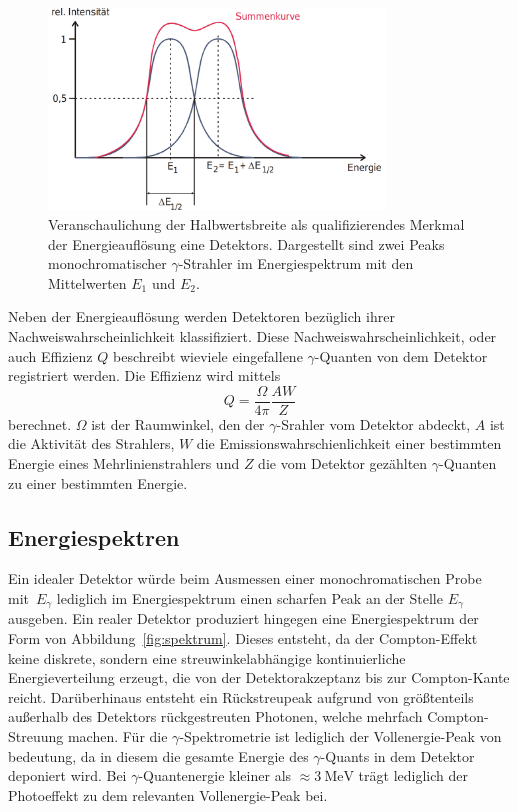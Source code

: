 \begin{figure}
  \centering
  \includegraphics[width=0.8\textwidth]{Pics/energieaufloesung.png}
  \caption{Veranschaulichung der Halbwertsbreite als qualifizierendes Merkmal der Energieauflösung eine Detektors.
  Dargestellt sind zwei Peaks monochromatischer $\gamma$-Strahler im Energiespektrum mit den
  Mittelwerten $E_1$ und $E_2$\cite{anleitung}.}
  \label{fig:energieauflösung}
\end{figure}

Neben der Energieauflösung werden Detektoren bezüglich ihrer Nachweiswahrscheinlichkeit
klassifiziert. Diese Nachweiswahrscheinlichkeit, oder auch Effizienz $Q$
beschreibt wieviele eingefallene $\gamma$-Quanten von dem Detektor
registriert werden.
Die Effizienz wird mittels
\begin{equation}
  \label{eqn:effizienz}
  Q = \frac{\Omega}{4\pi}\frac{AW}{Z}
\end{equation}
berechnet. $\Omega$ ist der Raumwinkel, den der $\gamma$-Srahler vom Detektor abdeckt,
$A$ ist die Aktivität des Strahlers, $W$ die Emissionswahrschienlichkeit einer bestimmten
Energie eines Mehrlinienstrahlers und $Z$ die vom Detektor gezählten $\gamma$-Quanten
zu einer bestimmten Energie.
\FloatBarrier
\subsection{Energiespektren}
\label{subsec:energiespektrum}

Ein idealer Detektor würde beim Ausmessen einer monochromatischen Probe mit~$E_\gamma$
lediglich im Energiespektrum einen scharfen Peak an der Stelle $E_\gamma$
ausgeben. Ein realer Detektor produziert hingegen eine Energiespektrum der
Form von Abbildung~\ref{fig:spektrum}. Dieses entsteht, da der Compton-Effekt
keine diskrete, sondern eine streuwinkelabhängige kontinuierliche Energieverteilung
erzeugt, die von der Detektorakzeptanz bis zur Compton-Kante reicht.
Darüberhinaus entsteht ein Rückstreupeak aufgrund von größtenteils
außerhalb des Detektors rückgestreuten Photonen, welche mehrfach Compton-Streuung
machen.
Für die $\gamma$-Spektrometrie ist lediglich der Vollenergie-Peak
von bedeutung, da in diesem die gesamte Energie des $\gamma$-Quants
in dem Detektor deponiert wird. Bei $\gamma$-Quantenergie kleiner
als $\approx\SI{3}{\MeV}$ trägt lediglich der Photoeffekt zu dem relevanten
Vollenergie-Peak bei.

